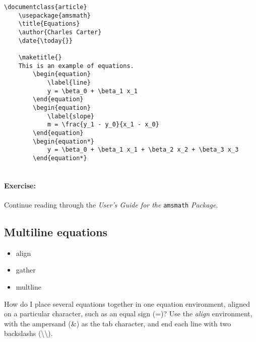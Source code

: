         \begin{verbatim}
\documentclass{article}
	\usepackage{amsmath}
    \title{Equations}
    \author{Charles Carter}
    \date{\today{}}
 
    \maketitle{}
	This is an example of equations.
		\begin{equation}
			\label{line}
			y = \beta_0 + \beta_1 x_1
		\end{equation}
		\begin{equation}
			\label{slope}
			m = \frac{y_1 - y_0}{x_1 - x_0}
		\end{equation}
		\begin{equation*}
			y = \beta_0 + \beta_1 x_1 + \beta_2 x_2 + \beta_3 x_3
		\end{equation*}
	    
        \end{verbatim}

		\paragraph{Exercise:}Continue reading through the \textit{User's Guide for the }\texttt{amsmath} \textit{Package}.

        \subsection{Multiline equations}
        \label{Multiline equations}
        
        \begin{cmd}
            \begin{itemize}
                \item{align}
                \item{gather}
                \item{multline}
            \end{itemize}
        \end{cmd}

		How do I place several equations together in one equation environment, aligned on a particular character, such as an equal sign (=)? Use the \textit{align} environment, with the ampersand (\&) as the tab character, and end each line with two backslashs (\textbackslash{}\textbackslash{}).

